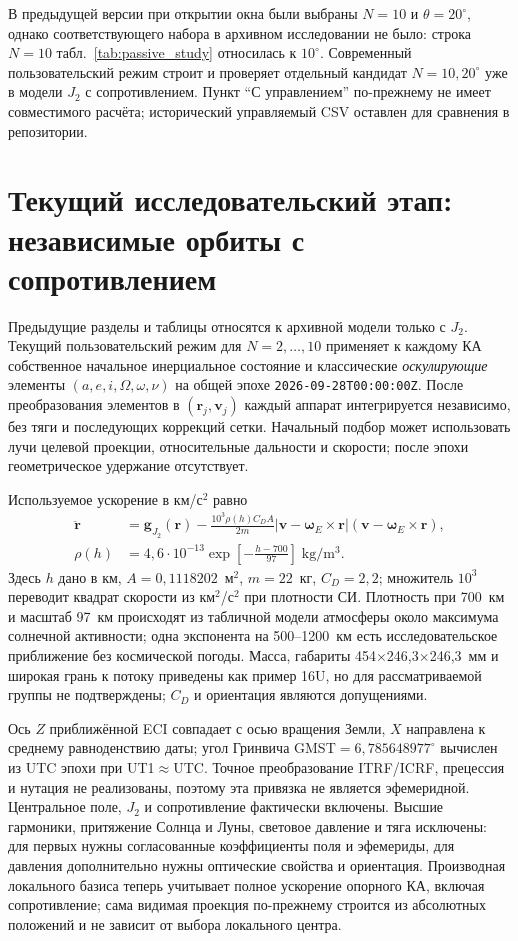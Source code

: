 \documentclass[a4paper,12pt]{article}
\begin{document}
В предыдущей версии при открытии окна были выбраны $N=10$ и
$\theta=20^\circ$, однако соответствующего набора в архивном
исследовании не было: строка $N=10$ табл.~\ref{tab:passive_study}
относилась к $10^\circ$. Современный пользовательский режим строит
и проверяет отдельный кандидат $N=10,20^\circ$ уже в модели
$J_2$ с сопротивлением. Пункт ``С управлением'' по-прежнему не
имеет совместимого расчёта; исторический управляемый CSV оставлен
для сравнения в репозитории.


\section{Текущий исследовательский этап: независимые орбиты с сопротивлением}

Предыдущие разделы и таблицы относятся к архивной модели только с $J_2$.
Текущий пользовательский режим для $N=2,\ldots,10$ применяет к каждому
КА собственное начальное инерциальное состояние и классические
\emph{оскулирующие} элементы $(a,e,i,\Omega,\omega,\nu)$ на общей эпохе
\texttt{2026-09-28T00:00:00Z}. После преобразования элементов в
$(\mathbf r_j,\mathbf v_j)$ каждый аппарат интегрируется независимо,
без тяги и последующих коррекций сетки. Начальный подбор может
использовать лучи целевой проекции, относительные дальности и скорости;
после эпохи геометрическое удержание отсутствует.

Используемое ускорение в км/с$^2$ равно
\begin{align}
 \ddot{\mathbf r}&=\mathbf g_{J_2}(\mathbf r)
 -\frac{10^3\rho(h)C_D A}{2m}
  |\mathbf v-\boldsymbol\omega_E\times\mathbf r|
  (\mathbf v-\boldsymbol\omega_E\times\mathbf r),\\
 \rho(h)&=4{,}6\cdot10^{-13}
 \exp\!\left[-\frac{h-700}{97}\right]\;\mathrm{kg/m^3}.
\end{align}
Здесь $h$ дано в км, $A=0{,}1118202$~м$^2$, $m=22$~кг,
$C_D=2{,}2$; множитель $10^3$ переводит квадрат скорости из
км$^2$/с$^2$ при плотности СИ. Плотность при 700~км и масштаб
97~км происходят из табличной модели атмосферы около максимума
солнечной активности; одна экспонента на 500--1200~км есть
исследовательское приближение без космической погоды. Масса,
габариты 454$\times$246{,}3$\times$246{,}3~мм и широкая грань к
потоку приведены как пример 16U, но для рассматриваемой группы
не подтверждены; $C_D$ и ориентация являются допущениями.

Ось $Z$ приближённой ECI совпадает с осью вращения Земли,
$X$ направлена к среднему равноденствию даты; угол Гринвича
GMST$=6{,}785648977^\circ$ вычислен из UTC эпохи при UT1$\approx$UTC.
Точное преобразование ITRF/ICRF, прецессия и нутация не реализованы,
поэтому эта привязка не является эфемеридной. Центральное поле,
$J_2$ и сопротивление фактически включены. Высшие гармоники,
притяжение Солнца и Луны, световое давление и тяга исключены:
для первых нужны согласованные коэффициенты поля и эфемериды,
для давления дополнительно нужны оптические свойства и ориентация.
Производная локального базиса теперь учитывает полное ускорение
опорного КА, включая сопротивление; сама видимая проекция по-прежнему
строится из абсолютных положений и не зависит от выбора локального центра.
\end{document}
